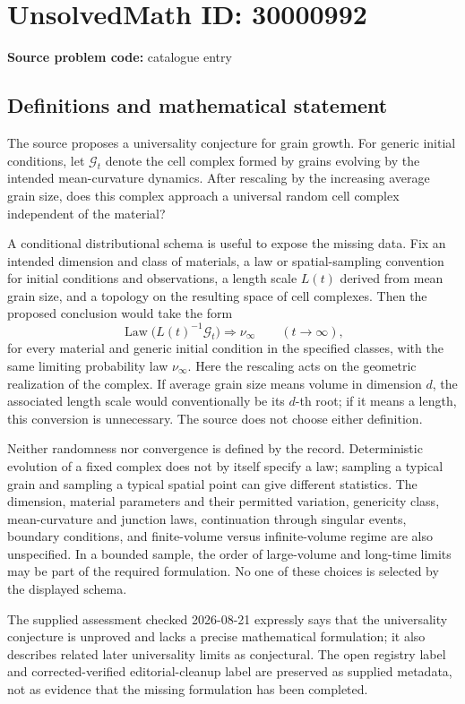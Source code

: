 \documentclass[11pt]{article}
\begin{document}
\section*{UnsolvedMath ID: 30000992}
\textbf{Source problem code:} catalogue entry
\subsection{Definitions and mathematical statement}
The source proposes a universality conjecture for grain growth. For generic initial conditions, let $\mathcal G_t$ denote the cell complex formed by grains evolving by the intended mean-curvature dynamics. After rescaling by the increasing average grain size, does this complex approach a universal random cell complex independent of the material?

A conditional distributional schema is useful to expose the missing data. Fix an intended dimension and class of materials, a law or spatial-sampling convention for initial conditions and observations, a length scale $L(t)$ derived from mean grain size, and a topology on the resulting space of cell complexes. Then the proposed conclusion would take the form
\[
\operatorname{Law}\bigl(L(t)^{-1}\mathcal G_t\bigr)
\Longrightarrow \nu_\infty\qquad(t\to\infty),
\]
for every material and generic initial condition in the specified classes, with the same limiting probability law $\nu_\infty$. Here the rescaling acts on the geometric realization of the complex. If average grain size means volume in dimension $d$, the associated length scale would conventionally be its $d$-th root; if it means a length, this conversion is unnecessary. The source does not choose either definition.

Neither randomness nor convergence is defined by the record. Deterministic evolution of a fixed complex does not by itself specify a law; sampling a typical grain and sampling a typical spatial point can give different statistics. The dimension, material parameters and their permitted variation, genericity class, mean-curvature and junction laws, continuation through singular events, boundary conditions, and finite-volume versus infinite-volume regime are also unspecified. In a bounded sample, the order of large-volume and long-time limits may be part of the required formulation. No one of these choices is selected by the displayed schema.

The supplied assessment checked 2026-08-21 expressly says that the universality conjecture is unproved and lacks a precise mathematical formulation; it also describes related later universality limits as conjectural. The open registry label and corrected-verified editorial-cleanup label are preserved as supplied metadata, not as evidence that the missing formulation has been completed.
\end{document}
